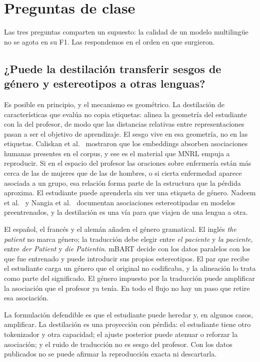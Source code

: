 \section{Preguntas de clase}
\label{sec:clase}

Las tres preguntas comparten un supuesto: la calidad de un modelo multilingüe no se agota en su F1. Las respondemos en el orden en que surgieron.

\subsection{¿Puede la destilación transferir sesgos de género y estereotipos a otras lenguas?}

Es posible en principio, y el mecanismo es geométrico. La destilación de características que evalúa \cite{piperno2025} no copia etiquetas: alinea la geometría del estudiante con la del profesor, de modo que las distancias relativas entre representaciones pasan a ser el objetivo de aprendizaje. El sesgo vive en esa geometría, no en las etiquetas. Caliskan et al.\ \cite{caliskan2017} mostraron que los embeddings absorben asociaciones humanas presentes en el corpus, y ese es el material que MNRL empuja a reproducir. Si en el espacio del profesor las oraciones sobre enfermería están más cerca de las de mujeres que de las de hombres, o si cierta enfermedad aparece asociada a un grupo, esa relación forma parte de la estructura que la pérdida aproxima. El estudiante puede aprenderla sin ver una etiqueta de género. Nadeem et al.\ \cite{nadeem2021} y Nangia et al.\ \cite{nangia2020} documentan asociaciones estereotipadas en modelos preentrenados, y la destilación es una vía para que viajen de una lengua a otra.

El español, el francés y el alemán añaden el género gramatical. El inglés \textit{the patient} no marca género; la traducción debe elegir entre \textit{el paciente} y \textit{la paciente}, entre \textit{der Patient} y \textit{die Patientin}. mBART \cite{liu2020} decide con los datos paralelos con los que fue entrenado y puede introducir sus propios estereotipos. El par que recibe el estudiante carga un género que el original no codificaba, y la alineación lo trata como parte del significado. El género impuesto por la traducción puede amplificar la asociación que el profesor ya tenía. En todo el flujo no hay un paso que retire esa asociación.

La formulación defendible es que el estudiante puede heredar y, en algunos casos, amplificar. La destilación es una proyección con pérdida: el estudiante tiene otro tokenizador y otra capacidad; el ajuste posterior puede atenuar o reforzar la asociación; y el ruido de traducción no es sesgo del profesor. Con los datos publicados no se puede afirmar la reproducción exacta ni descartarla.

